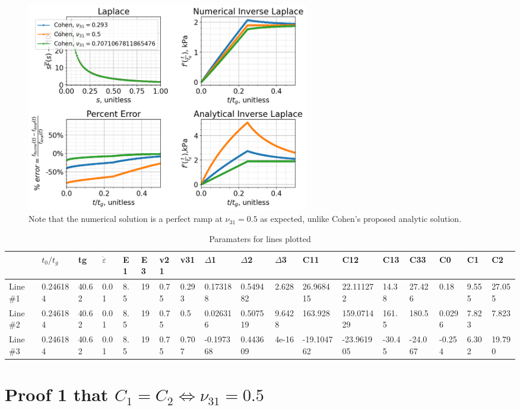 \documentclass{article}
\begin{document}
\begin{figure}[h]
\centering
\includegraphics[width=0.6\textwidth]{PlotsWhenC1=C2.png}
\caption{\label{fig:C1EqualsC2} Note that the numerical solution is a perfect ramp at $\nu_{31}=0.5$ as expected, unlike Cohen's proposed analytic solution.}
\end{figure}

\begin{table}[!ht]
    \centering
    \caption{\label{tab:C1EqualsC2} Paramaters for lines plotted}
    \begin{tabular}{|l|l|l|l|l|l|l|l|l|l|l|l|l|l|l|l|l|l|}
    \hline
        ~ & $t_0/t_g$ & tg & $\dot{\varepsilon{}}$ & E1 & E3 & v21 & v31 & $\Delta$1 & $\Delta$2 & $\Delta$3 & C11 & C12 & C13 & C33 & C0 & C1 & C2  \\ \hline
        Line \#1 & 0.246184 & 40.62 & 0.01 & 8.5 & 19 & 0.75 & 0.293 & 0.173188 & 0.549482 & 2.628 & 26.968415 & 22.111272 & 14.38 & 27.426 & 0.18 & 9.555 & 27.055  \\ \hline
        Line \#2 & 0.246184 & 40.62 & 0.01 & 8.5 & 19 & 0.75 & 0.5 & 0.026316 & 0.507519 & 9.6428 & 163.928 & 159.071429 & 161.5 & 180.5 & 0.0296 & 7.823 & 7.823  \\ \hline
        Line \#3 & 0.246184 & 40.62 & 0.01 & 8.5 & 19 & 0.75 & 0.707 & -0.197368 & 0.443609 & 4e-16 & -19.104762 & -23.961905 & -30.45 & -24.067 & -0.254 & 6.302 & 19.790 \\ \hline
    \end{tabular}
\end{table}

\section{Proof 1 that $C_1\!=\!C_2 \iff \nu_{31}\!=\!0.5$}
\end{document}
